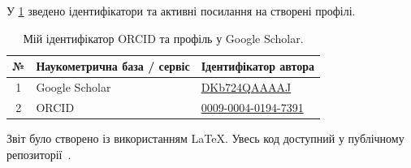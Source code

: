 \documentclass{article}
\begin{document}
У \cref{tab:author_profiles} зведено ідентифікатори та активні посилання на створені профілі.

\begin{table}[H]
  \caption{Мій ідентифікатор ORCID та профіль у Google Scholar.}
  \label{tab:author_profiles}
  \centering
  \begin{tabular}{|c|l|l|}
    \hline
    \textbf{№} & \textbf{Наукометрична база / сервіс} & \textbf{Ідентифікатор автора}                                               \\
    \hline
    1          & Google Scholar                       & \href{https://scholar.google.com/citations?user=DKb724QAAAAJ}{DKb724QAAAAJ} \\
    \hline
    2          & ORCID                                & \href{https://orcid.org/0009-0004-0194-7391}{0009-0004-0194-7391}           \\
    \hline
  \end{tabular}
\end{table}

Звіт було створено із використанням \LaTeX{}. Увесь код доступний у публічному репозиторії~\cite{github_science}.

\clearpage
\nocite{*}
\printbibliography[heading=bibintoc,title={СПИСОК ВИКОРИСТАНИХ ДЖЕРЕЛ}]
\end{document}
